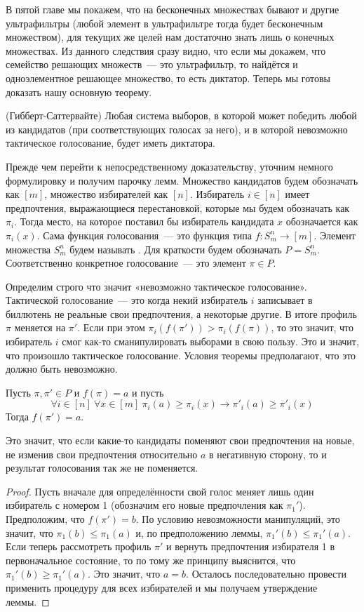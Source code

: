 В пятой главе мы покажем, что на бесконечных множествах бывают и другие ультрафильтры (любой элемент в ультрафильтре тогда будет бесконечным множеством), для текущих же целей нам достаточно знать лишь о конечных множествах. Из данного следствия сразу видно, что если мы докажем, что семейство решающих множеств~— это ультрафильтр, то найдётся и одноэлементное решающее множество, то есть диктатор. Теперь мы готовы доказать нашу основную теорему.

\begin{thm}
(Гибберт-Саттервайте) Любая система выборов, в которой может победить любой из кандидатов (при соответствующих голосах за него), и в которой невозможно тактическое голосование, будет иметь диктатора.
\end{thm}

Прежде чем перейти к непосредственному доказательству, уточним немного формулировку и получим парочку лемм. Множество кандидатов будем обозначать как $[m]$, множество избирателей как $[n]$. Избиратель $i\in [n]$ имеет предпочтения, выражающиеся перестановкой, которые мы будем обозначать как $\pi_i$. Тогда место, на которое поставил бы избиратель кандидата $x$ обозначается как $\pi_i(x)$. Сама функция голосования~— это функция типа $f:S_m^n\to [m]$. Элемент множества $S_m^n$ будем называть . Для краткости будем обозначать $P = S_m^n$. Соответственно конкретное голосование~— это элемент $\pi\in P$.

Определим строго что значит «невозможно тактическое голосование». Тактической голосование~— это когда некий избиратель $i$ записывает в биллютень не реальные свои предпочтения, а некоторые другие. В итоге профиль $\pi$ меняется на $\pi'$. Если при этом $\pi_i(f(\pi')) > \pi_i(f(\pi))$, то это значит, что избиратель $i$ смог как-то сманипулировать выборами в свою пользу. Это и значит, что произошло тактическое голосование. Условия теоремы предполагают, что это должно быть невозможно.

\begin{lemma}
Пусть $\pi, \pi'\in P$ и $f(\pi) = a$ и пусть
$$\forall i\in [n]\ \forall x\in[m]\ \pi_i(a)\ge\pi_i(x)\to\pi'_i(a)\ge\pi'_i(x)$$
Тогда $f(\pi') = a$.
\end{lemma}

Это значит, что если какие-то кандидаты поменяют свои предпочтения на новые, не изменив свои предпочтения относительно $a$ в негативную сторону, то и результат голосования так же не поменяется.

\begin{proof}
Пусть вначале для определённости свой голос меняет лишь один избиратель с номером 1 (обозначим его новые предпочления как $\pi_1'$). Предположим, что $f(\pi') = b$. По условию невозможности манипуляций, это значит, что $\pi_1(b)\le\pi_1(a)$ и, по предположению леммы, $\pi_1'(b)\le\pi_1'(a)$. Если теперь рассмотреть профиль $\pi'$ и вернуть предпочтения избирателя 1 в первоначальное состояние, то по тому же принципу выяснится, что $\pi_1'(b)\ge\pi_1'(a)$. Это значит, что $a=b$. Осталось последовательно провести применить процедуру для всех избирателей и мы получаем утверждение леммы.
\end{proof}

